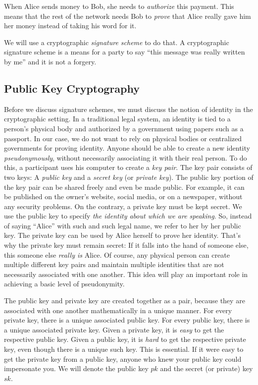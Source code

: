When Alice sends money to Bob, she needs to \emph{authorize} this payment. This means
that the rest of the network needs Bob to \emph{prove} that Alice really gave him
her money instead of taking his word for it.

We will use a cryptographic \emph{signature scheme} to do that. A cryptographic signature
scheme is a means for a party to say ``this message was really written by me'' and it is
not a forgery.

\subsection*{Public Key Cryptography}

Before we discuss signature schemes, we must discuss the notion of identity in the cryptographic
setting. In a traditional legal system, an identity is tied to a person's physical body
and authorized by a government using papers such as a passport. In our case, we do not want
to rely on physical bodies or centralized governments for proving identity. Anyone should be
able to create a new identity \emph{pseudonymously}, without necessarily associating it with
their real person. To do this, a participant uses his computer to create a \emph{key pair}.
The key pair consists of two keys: A \emph{public key} and a \emph{secret key}
(or \emph{private key}). The public key portion of the key pair can be shared freely and even
be made public. For example, it can be published on the owner's website, social media, or on
a newspaper, without any security problems. On the contrary, a private key must be kept secret.
We use the public key to specify \emph{the identity about which we are speaking}. So, instead
of saying ``Alice'' with such and such legal name, we refer to her by her public
key. The private key can be used by Alice herself to prove her identity. That's why the
private key must remain secret: If it falls into the hand of someone else, this someone
else \emph{really is} Alice. Of course, any physical person can create multiple different
key pairs and maintain multiple identities that are not necessarily associated with one
another. This idea will play an important role in achieving a basic level of pseudonymity.

The public key and private key are created together as a pair, because they are associated
with one another mathematically in a unique manner. For every private key, there is a unique
associated public key. For every public key, there is a unique associated private key.
Given a private key, it is \emph{easy} to get the respective public key. Given a public
key, it is \emph{hard} to get the respective private key, even though there is a unique
such key. This is essential. If it were easy to get the private key from a public key,
anyone who knew your public key could impersonate you. We will denote the public key
%
$pk$
and the secret (or private) key
%
$sk$.

